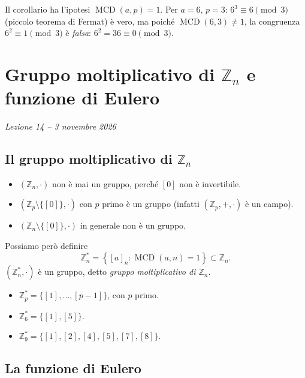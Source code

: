 \documentclass[11pt,a4paper]{article}
\begin{document}
\begin{osservazione}
Il corollario ha l'ipotesi $\operatorname{MCD}(a, p) = 1$. Per $a = 6$, $p = 3$: $6^3 \equiv 6 \pmod 3$ (piccolo teorema di Fermat) è vero, ma poiché $\operatorname{MCD}(6, 3) \neq 1$, la congruenza $6^2 \equiv 1 \pmod 3$ è \emph{falsa}: $6^2 = 36 \equiv 0 \pmod 3$.
\end{osservazione}

\section[Gruppo moltiplicativo di $\mathbb{Z}_n$ e funzione di Eulero (Lezione 14 -- 3 novembre 2026)]{Gruppo moltiplicativo di $\mathbb{Z}_n$ e funzione di Eulero}
\noindent\emph{Lezione 14 -- 3 novembre 2026}
\subsection{Il gruppo moltiplicativo di $\mathbb{Z}_n$}

\begin{itemize}
  \item $(\mathbb{Z}_n, \cdot)$ non è mai un gruppo, perché $[0]$ non è invertibile.
  \item $(\mathbb{Z}_p\setminus\{[0]\}, \cdot)$ con $p$ primo è un gruppo (infatti $(\mathbb{Z}_p, +, \cdot)$ è un campo).
  \item $(\mathbb{Z}_n\setminus\{[0]\}, \cdot)$ in generale non è un gruppo.
\end{itemize}
Possiamo però definire
\[
  \mathbb{Z}_n^* = \left\{ [a]_n : \operatorname{MCD}(a, n) = 1 \right\} \subset \mathbb{Z}_n .
\]
$(\mathbb{Z}_n^*, \cdot)$ è un gruppo, detto \emph{gruppo moltiplicativo di $\mathbb{Z}_n$}.

\begin{esempio}
\begin{itemize}
  \item $\mathbb{Z}_p^* = \{[1], \dots, [p-1]\}$, con $p$ primo.
  \item $\mathbb{Z}_6^* = \{[1], [5]\}$.
  \item $\mathbb{Z}_9^* = \{[1], [2], [4], [5], [7], [8]\}$.
\end{itemize}
\end{esempio}

\subsection{La funzione di Eulero}
\end{document}
